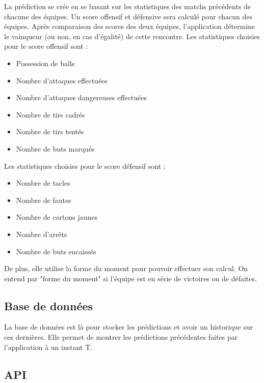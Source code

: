 \documentclass[a4paper,14pt]{extarticle}
\begin{document}
{La prédiction se crée en se basant sur les statistiques des matchs précédents de chacune des équipes. Un score offensif et défensive sera calculé pour chacun des équipes. Après comparaison des scores des deux équipes, l'application détermine le vainqueur (ou non, en cas d'égalité) de cette rencontre. 
 Les statistiques choisies pour le score offensif sont : 
\begin{itemize}
    \item Possession de balle
    \item Nombre d'attaques effectuées
    \item Nombre d'attaques dangereuses effectuées
    \item Nombre de tirs cadrés
    \item Nombre de tirs tentés
    \item Nombre de buts marqués
\end{itemize}

Les statistiques choisies pour le score défensif sont : 
\begin{itemize}
    \item Nombre de tacles
    \item Nombre de fautes
    \item Nombre de cartons jaunes
    \item Nombre d'arrêts
    \item Nombre de buts encaissés
\end{itemize}
De plus, elle utilise la forme du moment pour pouvoir effectuer son calcul. On entend par "forme du moment" si l'équipe est en série de victoires ou de défaites.
\subsection{Base de données}

La base de données est là pour stocker les prédictions et avoir un historique sur ces dernières. Elle permet de montrer les prédictions précédentes faites par l'application à un instant T.

\newpage

\subsection{API}

}
\end{document}
